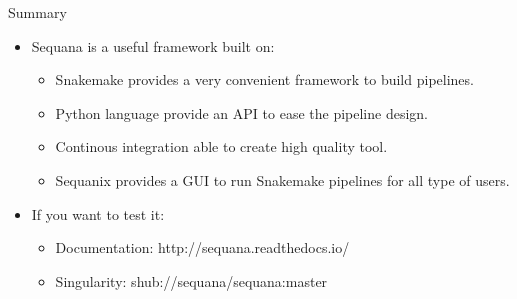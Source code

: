 \documentclass{beamer}
\begin{document}
\begin{frame}{Summary}
    \begin{itemize}
        \item Sequana is a useful framework built on:
            \begin{itemize}
                \item Snakemake provides a very convenient framework to build pipelines.
                \item Python language provide an API to ease the pipeline design.
                \item Continous integration able to create high quality tool.
                \item Sequanix provides a GUI to run Snakemake pipelines for all type of users.
            \end{itemize}
        \item If you want to test it:
            \begin{itemize}
                \item Documentation: http://sequana.readthedocs.io/
                \item Singularity: shub://sequana/sequana:master
            \end{itemize}
    \end{itemize}
\end{frame}
\end{document}
